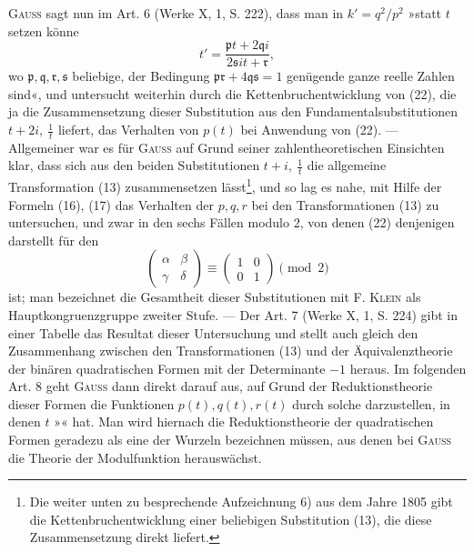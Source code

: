 \par
\textsc{Gauss} sagt nun im Art. 6 (Werke X, 1, S. 222), dass man in \(k'=q^2/p^2\)
»statt \(t\) setzen könne
\begingroup\makeatletter\tagsleft@true\let\veqno\leqno\makeatother
\begin{equation*}
t'=\frac{\mathfrak p t+2\mathfrak q i}{2\mathfrak s it+\mathfrak r},\tag{22}
\end{equation*}
\endgroup
\noindent wo \(\mathfrak p,\mathfrak q,\mathfrak r,\mathfrak s\) beliebige, der Bedingung
\(\mathfrak p\mathfrak r+4\mathfrak q\mathfrak s=1\) genügende ganze reelle
Zahlen sind«, und untersucht weiterhin durch die Kettenbruchentwicklung von
(22), die ja die Zusammensetzung dieser Substitution aus den Fundamentalsubstitutionen \(t+2i,\ \frac1t\) liefert, das Verhalten von \(p(t)\) bei Anwendung von
(22). — Allgemeiner war es für \textsc{Gauss} auf Grund seiner zahlentheoretischen
Einsichten klar, dass sich aus den beiden Substitutionen \(t+i,\ \frac1t\) die allgemeine
Transformation (13) zusammensetzen lässt\footnote{Die weiter unten zu besprechende Aufzeichnung 6) aus dem Jahre 1805 gibt die Kettenbruchentwicklung einer beliebigen Substitution (13), die diese Zusammensetzung direkt liefert.}, und so lag es nahe, mit
Hilfe der Formeln (16), (17) das Verhalten der \(p,q,r\) bei den Transformationen
(13) zu untersuchen, und zwar in den sechs Fällen modulo 2, von
denen (22) denjenigen darstellt für den
\begingroup\makeatletter\tagsleft@true\let\veqno\leqno\makeatother
\begin{equation*}
\begin{pmatrix}\alpha&\beta\\\gamma&\delta\end{pmatrix}
\equiv\begin{pmatrix}1&0\\0&1\end{pmatrix}\pmod 2\tag{22a}
\end{equation*}
\endgroup
\noindent ist; man bezeichnet die Gesamtheit dieser Substitutionen mit F. \textsc{Klein} als
Hauptkongruenzgruppe zweiter Stufe. — Der Art. 7 (Werke X, 1, S. 224) gibt
in einer Tabelle das Resultat dieser Untersuchung und stellt auch gleich den
Zusammenhang zwischen den Transformationen (13) und der Äquivalenztheorie
der binären quadratischen Formen mit der Determinante \(-1\) heraus. Im
folgenden Art. 8 geht \textsc{Gauss} dann direkt darauf aus, auf Grund der Reduktionstheorie
dieser Formen die Funktionen \(p(t),q(t),r(t)\) durch solche darzustellen,
in denen \(t\) »« hat. Man wird hiernach die
Reduktionstheorie der quadratischen Formen geradezu als eine der Wurzeln
bezeichnen müssen, aus denen bei \textsc{Gauss} die Theorie der Modulfunktion herauswächst.

